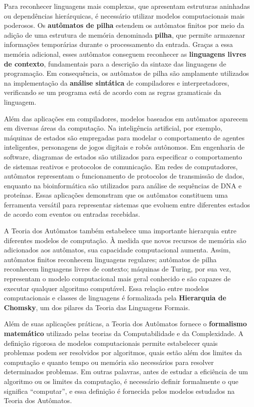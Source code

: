 \documentclass[
  brazilian,
  letterpaper,
]{book}
\theoremstyle{plain}
\theoremstyle{definition}
\theoremstyle{remark}
\begin{document}
Para reconhecer linguagens mais complexas, que apresentam estruturas
aninhadas ou dependências hierárquicas, é necessário utilizar modelos
computacionais mais poderosos. Os \textbf{autômatos de pilha} estendem
os autômatos finitos por meio da adição de uma estrutura de memória
denominada \textbf{pilha}, que permite armazenar informações temporárias
durante o processamento da entrada. Graças a essa memória adicional,
esses autômatos conseguem reconhecer as \textbf{linguagens livres de
contexto}, fundamentais para a descrição da sintaxe das linguagens de
programação. Em consequência, os autômatos de pilha são amplamente
utilizados na implementação da \textbf{análise sintática} de
compiladores e interpretadores, verificando se um programa está de
acordo com as regras gramaticais da linguagem.

Além das aplicações em compiladores, modelos baseados em autômatos
aparecem em diversas áreas da computação. Na inteligência artificial,
por exemplo, máquinas de estados são empregadas para modelar o
comportamento de agentes inteligentes, personagens de jogos digitais e
robôs autônomos. Em engenharia de software, diagramas de estados são
utilizados para especificar o comportamento de sistemas reativos e
protocolos de comunicação. Em redes de computadores, autômatos
representam o funcionamento de protocolos de transmissão de dados,
enquanto na bioinformática são utilizados para análise de sequências de
DNA e proteínas. Essas aplicações demonstram que os autômatos constituem
uma ferramenta versátil para representar sistemas que evoluem entre
diferentes estados de acordo com eventos ou entradas recebidas.

A Teoria dos Autômatos também estabelece uma importante hierarquia entre
diferentes modelos de computação. À medida que novos recursos de memória
são adicionados aos autômatos, sua capacidade computacional aumenta.
Assim, autômatos finitos reconhecem linguagens regulares; autômatos de
pilha reconhecem linguagens livres de contexto; máquinas de Turing, por
sua vez, representam o modelo computacional mais geral conhecido e são
capazes de executar qualquer algoritmo computável. Essa relação entre
modelos computacionais e classes de linguagens é formalizada pela
\textbf{Hierarquia de Chomsky}, um dos pilares da Teoria das Linguagens
Formais.

Além de suas aplicações práticas, a Teoria dos Autômatos fornece o
\textbf{formalismo matemático} utilizado pelas teorias da
Computabilidade e da Complexidade. A definição rigorosa de modelos
computacionais permite estabelecer quais problemas podem ser resolvidos
por algoritmos, quais estão além dos limites da computação e quanto
tempo ou memória são necessários para resolver determinados problemas.
Em outras palavras, antes de estudar a eficiência de um algoritmo ou os
limites da computação, é necessário definir formalmente o que significa
``computar'', e essa definição é fornecida pelos modelos estudados na
Teoria dos Autômatos.
\end{document}
